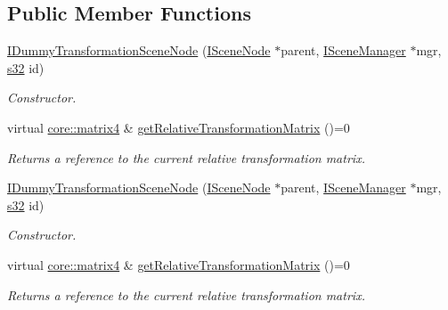 \subsection*{Public Member Functions}
\begin{DoxyCompactItemize}
\item 
\mbox{\label{classirr_1_1scene_1_1IDummyTransformationSceneNode_a542c82a6fb76e99ea9773b974363fab1}} 
\hyperlink{classirr_1_1scene_1_1IDummyTransformationSceneNode_a542c82a6fb76e99ea9773b974363fab1}{I\+Dummy\+Transformation\+Scene\+Node} (\hyperlink{classirr_1_1scene_1_1ISceneNode}{I\+Scene\+Node} $\ast$parent, \hyperlink{classirr_1_1scene_1_1ISceneManager}{I\+Scene\+Manager} $\ast$mgr, \hyperlink{namespaceirr_ac66849b7a6ed16e30ebede579f9b47c6}{s32} id)
\begin{DoxyCompactList}\small\item\em Constructor. \end{DoxyCompactList}\item 
virtual \hyperlink{namespaceirr_1_1core_a4c9d4e29899535971052810954a14431}{core\+::matrix4} \& \hyperlink{classirr_1_1scene_1_1IDummyTransformationSceneNode_a95612d8bb225213c907fbf5a2606f0d3}{get\+Relative\+Transformation\+Matrix} ()=0
\begin{DoxyCompactList}\small\item\em Returns a reference to the current relative transformation matrix. \end{DoxyCompactList}\item 
\mbox{\label{classirr_1_1scene_1_1IDummyTransformationSceneNode_a542c82a6fb76e99ea9773b974363fab1}} 
\hyperlink{classirr_1_1scene_1_1IDummyTransformationSceneNode_a542c82a6fb76e99ea9773b974363fab1}{I\+Dummy\+Transformation\+Scene\+Node} (\hyperlink{classirr_1_1scene_1_1ISceneNode}{I\+Scene\+Node} $\ast$parent, \hyperlink{classirr_1_1scene_1_1ISceneManager}{I\+Scene\+Manager} $\ast$mgr, \hyperlink{namespaceirr_ac66849b7a6ed16e30ebede579f9b47c6}{s32} id)
\begin{DoxyCompactList}\small\item\em Constructor. \end{DoxyCompactList}\item 
virtual \hyperlink{namespaceirr_1_1core_a4c9d4e29899535971052810954a14431}{core\+::matrix4} \& \hyperlink{classirr_1_1scene_1_1IDummyTransformationSceneNode_a95612d8bb225213c907fbf5a2606f0d3}{get\+Relative\+Transformation\+Matrix} ()=0
\begin{DoxyCompactList}\small\item\em Returns a reference to the current relative transformation matrix. \end{DoxyCompactList}\end{DoxyCompactItemize}

